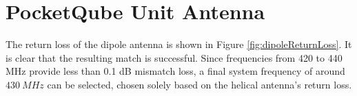 \graphicspath{{./figures}}

\section{PocketQube Unit Antenna}

The return loss of the dipole antenna is shown in Figure \ref{fig:dipoleReturnLoss}. It is clear that the resulting match is successful. Since frequencies from 420 to 440 MHz provide less than 0.1 dB mismatch loss, a final system frequency of around $\SI{430}{MHz}$ can be selected, chosen solely based on the helical antenna's return loss.